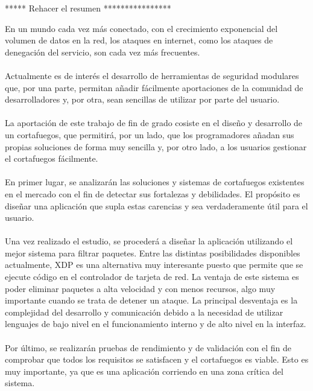 ***** Rehacer el resumen ****************

En un mundo cada vez más conectado, con el crecimiento exponencial del volumen de datos en la red, los ataques en internet, como los ataques de denegación del servicio, son cada vez más frecuentes.
\\\\Actualmente es de interés el desarrollo de herramientas de seguridad modulares que, por una parte, permitan añadir fácilmente aportaciones de la comunidad de desarrolladores y, por otra, sean sencillas de utilizar por parte del usuario.
\\\\La aportación de este trabajo de fin de grado cosiste en el diseño y desarrollo de un cortafuegos, que permitirá, por un lado, que los programadores añadan sus propias soluciones de forma muy sencilla y, por otro lado,  a los usuarios gestionar el cortafuegos fácilmente.
\\\\En primer lugar, se analizarán las soluciones y sistemas de cortafuegos existentes en el mercado con el fin de detectar sus fortalezas y debilidades. El propósito es diseñar una aplicación que supla estas carencias y sea verdaderamente útil para el usuario.
\\\\Una vez realizado el estudio, se procederá a diseñar la aplicación utilizando el mejor sistema para filtrar paquetes. Entre las distintas posibilidades disponibles actualmente, XDP es una alternativa muy interesante puesto que permite que se ejecute código en el controlador de tarjeta de red. La ventaja de este sistema es poder eliminar paquetes a alta velocidad y con menos recursos, algo muy importante cuando se trata de detener un ataque. La principal desventaja es la complejidad del desarrollo y comunicación debido a la necesidad de utilizar lenguajes de bajo nivel en el funcionamiento interno y de alto nivel en la interfaz.
\\\\Por último, se realizarán pruebas de rendimiento y de validación con el fin de comprobar que todos los requisitos se satisfacen y el cortafuegos es viable. Esto es muy importante, ya que es una aplicación corriendo en una zona crítica del sistema.

